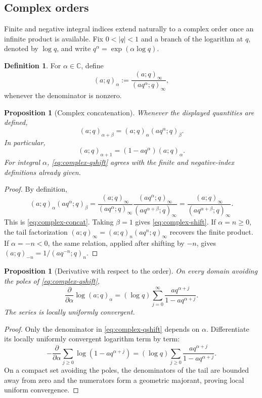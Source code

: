 \documentclass[11pt,oneside,openany]{book}
\newtheorem{proposition}[theorem]{Proposition}
\theoremstyle{definition}
\newtheorem{definition}[theorem]{Definition}
\theoremstyle{remark}
\newcommand{\C}{\mathbb C}
\newcommand{\abs}[1]{\lvert #1\rvert}
\begin{document}
\subsection{Complex orders}

Finite and negative integral indices extend naturally to a complex order once an infinite product is available.  Fix $0<\abs q<1$ and a branch of the logarithm at $q$, denoted by $\log q$, and write $q^\alpha=\exp(\alpha\log q)$.

\begin{definition}\label{def:complex-qshift}
For $\alpha\in\C$, define
\[
 (a;q)_\alpha
 :=\frac{(a;q)_\infty}{(aq^\alpha;q)_\infty},
 \tag{1.1}\label{eq:complex-qshift}
\]
whenever the denominator is nonzero.
\end{definition}

\begin{proposition}[Complex concatenation]\label{prop:complex-concat}
Whenever the displayed quantities are defined,
\[
 (a;q)_{\alpha+\beta}
 =(a;q)_\alpha(aq^\alpha;q)_\beta.
 \tag{1.2}\label{eq:complex-concat}
\]
In particular,
\[
 (a;q)_{\alpha+1}=(1-aq^\alpha)(a;q)_\alpha.
 \tag{1.3}\label{eq:complex-shift}
\]
For integral $\alpha$, \eqref{eq:complex-qshift} agrees with the finite and negative-index definitions already given.
\end{proposition}

\begin{proof}
By definition,
\[
 (a;q)_\alpha(aq^\alpha;q)_\beta
 =\frac{(a;q)_\infty}{(aq^\alpha;q)_\infty}
  \frac{(aq^\alpha;q)_\infty}{(aq^{\alpha+\beta};q)_\infty}
 =\frac{(a;q)_\infty}{(aq^{\alpha+\beta};q)_\infty}.
\]
This is \eqref{eq:complex-concat}.  Taking $\beta=1$ gives \eqref{eq:complex-shift}.  If $\alpha=n\ge0$, the tail factorization
\(
 (a;q)_\infty=(a;q)_n(aq^n;q)_\infty
\)
recovers the finite product.  If $\alpha=-n<0$, the same relation, applied after shifting by $-n$, gives
\(
 (a;q)_{-n}=1/(aq^{-n};q)_n.
\)
\end{proof}

\begin{proposition}[Derivative with respect to the order]\label{prop:order-derivative}
On every domain avoiding the poles of \eqref{eq:complex-qshift},
\[
 \frac{\partial}{\partial\alpha}\log(a;q)_\alpha
 =(\log q)\sum_{j=0}^{\infty}
 \frac{aq^{\alpha+j}}{1-aq^{\alpha+j}}.
 \tag{1.4}\label{eq:order-derivative}
\]
The series is locally uniformly convergent.
\end{proposition}

\begin{proof}
Only the denominator in \eqref{eq:complex-qshift} depends on $\alpha$.  Differentiate its locally uniformly convergent logarithm term by term:
\[
 -\frac{\partial}{\partial\alpha}
 \sum_{j\ge0}\log(1-aq^{\alpha+j})
 =(\log q)\sum_{j\ge0}
 \frac{aq^{\alpha+j}}{1-aq^{\alpha+j}}.
\]
On a compact set avoiding the poles, the denominators of the tail are bounded away from zero and the numerators form a geometric majorant, proving local uniform convergence.
\end{proof}
\end{document}
